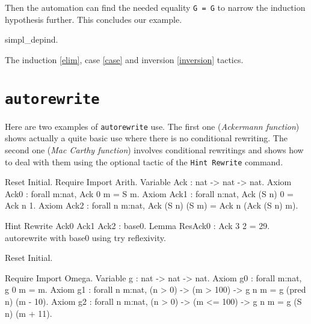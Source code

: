 \begin{coq_example*}
Then the automation can find the needed equality {\tt G = G} to narrow
the induction hypothesis further. This concludes our example.

\begin{coq_example}
  simpl_depind.
\end{coq_example}

\SeeAlso The induction \ref{elim}, case \ref{case} and inversion \ref{inversion} tactics.

\section[\tt autorewrite]{\tt autorewrite\label{autorewrite-example}}

Here are two examples of {\tt autorewrite} use. The first one ({\em Ackermann
function}) shows actually a quite basic use where there is no conditional
rewriting. The second one ({\em Mac Carthy function}) involves conditional
rewritings and shows how to deal with them using the optional tactic of the
{\tt Hint~Rewrite} command.

\firstexample
{}

\begin{coq_example*}
Reset Initial.
Require Import Arith.
Variable Ack : 
           nat -> nat -> nat.
Axiom Ack0 : 
        forall m:nat, Ack 0 m = S m.
Axiom Ack1 : forall n:nat, Ack (S n) 0 = Ack n 1.
Axiom Ack2 : forall n m:nat, Ack (S n) (S m) = Ack n (Ack (S n) m).
\end{coq_example*}

\begin{coq_example}
Hint Rewrite Ack0 Ack1 Ack2 : base0.
Lemma ResAck0 : 
 Ack 3 2 = 29.
autorewrite with base0 using try reflexivity.
\end{coq_example}

\begin{coq_eval}
Reset Initial.
\end{coq_eval}


\begin{coq_example*}
Require Import Omega.
Variable g :   
           nat -> nat -> nat.
Axiom g0 : 
        forall m:nat, g 0 m = m.
Axiom
  g1 :
    forall n m:nat,
      (n > 0) -> (m > 100) -> g n m = g (pred n) (m - 10).
Axiom
  g2 :
    forall n m:nat,
      (n > 0) -> (m <= 100) -> g n m = g (S n) (m + 11).
\end{coq_example*}


\end{coq_example*}
